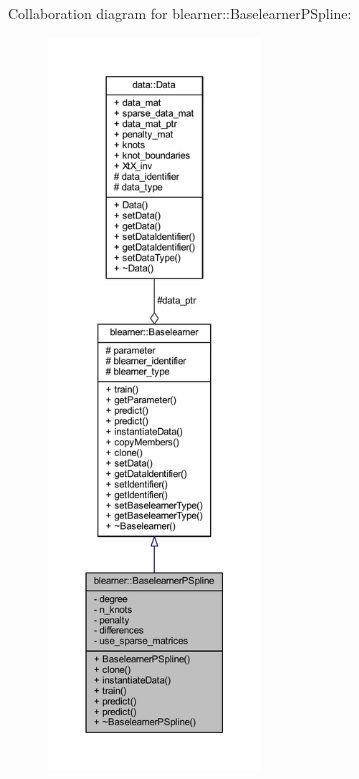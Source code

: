 Collaboration diagram for blearner\+:\+:Baselearner\+P\+Spline\+:\nopagebreak
\begin{figure}[H]
\begin{center}
\leavevmode
\includegraphics[height=550pt]{classblearner_1_1_baselearner_p_spline__coll__graph}
\end{center}
\end{figure}

